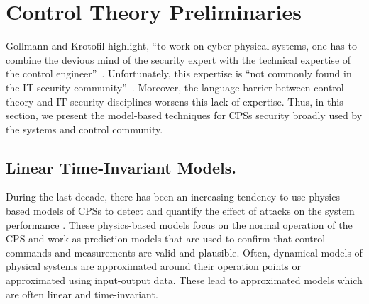 {
\section{Control Theory Preliminaries}
Gollmann and Krotofil highlight, ``to work on cyber-physical systems, one has to combine the devious mind of the security expert with the technical expertise of the control engineer''~\cite{CPSSec}. 
Unfortunately, this expertise is ``not commonly found in the IT security community''~\cite{CPSSecVinyl}. 
Moreover, the language barrier between control theory and IT security disciplines worsens this lack of expertise.
Thus, in this section, we present the model-based techniques for CPSs security broadly used by the systems and control community.
\subsection{Linear Time-Invariant Models.} 
During the last decade, there has been an increasing tendency to use physics-based models of CPSs to detect and quantify the effect of attacks on the system performance \cite{CPSAttacksAgainstPCS,Urbina2016,CPSDetectingIntegrityAttacksScada,CPSIntegrityAttacks,Carlos_Justin1,Carlos_Justin2,ReachableSets}. These physics-based models focus on the normal operation of the CPS and work as prediction models that are used to confirm that control commands and measurements are valid and plausible. Often, dynamical models of physical systems are approximated around their operation points or approximated using input-output data. These lead to approximated models which are often linear and time-invariant.

}
